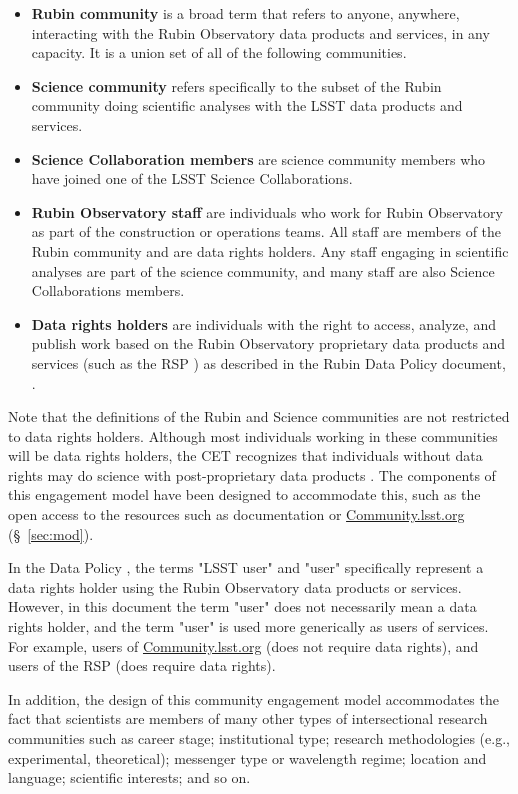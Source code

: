 \documentclass[DM,lsstdraft,toc]{lsstdoc}
\begin{document}
\begin{itemize}
\item \textbf{Rubin community} is a broad term that refers to anyone, anywhere, interacting with the Rubin Observatory data products and services, in any capacity. It is a union set of all of the following communities.
\item \textbf{Science community} refers specifically to the subset of the Rubin community doing scientific analyses with the LSST data products and services.
\item \textbf{Science Collaboration members} are science community members who have joined one of the LSST Science Collaborations.
\item \textbf{Rubin Observatory staff} are individuals who work for Rubin Observatory as part of the construction or operations teams. All staff are members of the Rubin community and are data rights holders. Any staff engaging in scientific analyses are part of the science community, and many staff are also Science Collaborations members.
\item \textbf{Data rights holders} are individuals with the right to access, analyze, and publish work based on the Rubin Observatory proprietary data products and services (such as the RSP ) as described in the Rubin Data Policy document, . 
\end{itemize}

Note that the definitions of the Rubin and Science communities are not restricted to data rights holders. 
Although most individuals working in these communities will be data rights holders, the CET recognizes that individuals without data rights may do science with post-proprietary data products .
The components of this engagement model have been designed to accommodate this, such as the open access to the resources such as documentation or \url{Community.lsst.org} (\S~\ref{sec:mod}).

In the Data Policy , the terms "LSST user" and "user" specifically represent a data rights holder using the Rubin Observatory data products or services. 
However, in this document the term "user" does not necessarily mean a data rights holder, and the term "user" is used more generically as users of services.
For example, users of \url{Community.lsst.org} (does not require data rights), and users of the RSP (does require data rights).

In addition, the design of this community engagement model accommodates the fact that scientists are members of many other types of intersectional research communities such as career stage; institutional type; research methodologies (e.g., experimental, theoretical); messenger type or wavelength regime; location and language; scientific interests; and so on.
\end{document}
